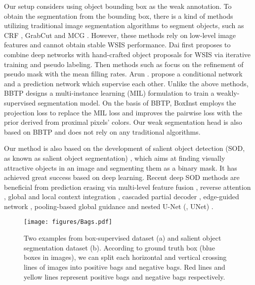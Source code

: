 \documentclass[final]{cvpr}
\begin{document}
Our setup considers using object bounding box as the weak annotation. To obtain the segmentation from the bounding box, there is a kind of methods \cite{dai2015boxsup,papandreou2015weakly,khoreva2017simple} utilizing traditional image segmentation algorithms to segment objects, such as CRF \cite{krahenbuhl2011efficient}, GrabCut \cite{rother2004grabcut} and MCG \cite{pont2016multiscale}. However, these methods rely on low-level image features and cannot obtain stable WSIS performance. Dai \etal \cite{dai2015boxsup} first proposes to combine deep networks with hand-crafted object proposals for WSIS via iterative training and pseudo labeling. Then methods such as \cite{song2019box,kulharia12356box2seg} focus on the refinement of pseudo mask with the mean filling rates. Arun \etal. \cite{arun2020weakly} propose a conditional network and a prediction network which supervise each other. Unlike the above methods, BBTP \cite{hsu2019weakly} designs a multi-instance learning (MIL) formulation to train a weakly-supervised segmentation model. On the basis of BBTP, BoxInst \cite{tian2020boxinst} employs the projection loss to replace the MIL loss and improves the pairwise loss with the prior derived from proximal pixels’ colors. Our weak segmentation head is also based on BBTP and does not rely on any traditional algorithms.

Our method is also based on the development of salient object detection (SOD, as known as salient object segmentation) \cite{jiang2013salient,yang2013saliency,li2013saliency,borji2015salient,li2016deep,hou2017deeply,wang2017learning}, which aims at finding visually attractive objects in an image and segmenting them as a binary mask. It has achieved great success based on deep learning. Recent deep SOD methods are beneficial from prediction erasing via multi-level feature fusion \cite{zhang2017amulet}, reverse attention \cite{chen2018reverse}, global and local context integration \cite{Liu2018PiCANet}, cascaded partial decoder \cite{wu2019cascaded}, edge-guided network \cite{zhao2019egnet}, pooling-based global guidance \cite{liu2019simple} and nested U-Net (\ie, UNet) \cite{qin2020u2}.

\begin{figure}[ht]
\centering
\texttt{[image: figures/Bags.pdf]}
\caption{Two examples from box-supervised dataset (a) and salient object segmentation dataset (b). According to ground truth box (blue boxes in images), we can split each horizontal and vertical crossing lines of images into positive bags and negative bags. Red lines and yellow lines represent positive bags and negative bags respectively.}
\label{fig:bags}
\end{figure}
\end{document}
